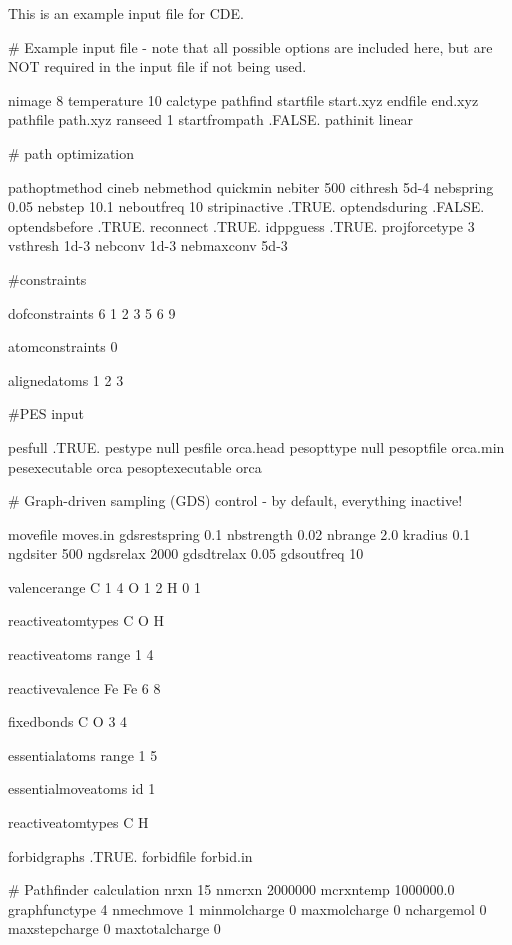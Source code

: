 This is an example input file for C\+DE.

\begin{DoxyVerb} # Example input file - note that all possible options are included here, but are NOT required in the input file if not being used.

 nimage 8
 temperature 10
 calctype pathfind 
 startfile start.xyz
 endfile end.xyz
 pathfile path.xyz
 ranseed  1
 startfrompath   .FALSE.
 pathinit  linear

 # path optimization

 pathoptmethod cineb
 nebmethod quickmin
 nebiter 500
 cithresh 5d-4
 nebspring 0.05
 nebstep  10.1
 neboutfreq 10
 stripinactive .TRUE.
 optendsduring .FALSE.
 optendsbefore .TRUE.
 reconnect .TRUE.
 idppguess .TRUE.
 projforcetype 3
 vsthresh 1d-3
 nebconv 1d-3
 nebmaxconv 5d-3

 #constraints

 dofconstraints 6
 1 2 3 5 6 9

 atomconstraints 0

 alignedatoms
 1 2 3

 #PES input

 pesfull .TRUE.
 pestype  null
 pesfile   orca.head
 pesopttype  null
 pesoptfile orca.min
 pesexecutable orca
 pesoptexecutable orca

 # Graph-driven sampling (GDS) control - by default, everything inactive!

 movefile moves.in
 gdsrestspring 0.1
 nbstrength 0.02
 nbrange 2.0
 kradius 0.1
 ngdsiter 500
 ngdsrelax 2000
 gdsdtrelax 0.05
 gdsoutfreq 10

 valencerange{
 C 1 4
 O 1 2
 H 0 1
 }

 reactiveatomtypes{
 C
 O
 H
 }

 reactiveatoms{
 range 1 4
 }

 reactivevalence{
 Fe Fe 6 8
 }

 fixedbonds{
 C O
 3 4
 }

 essentialatoms{
 range 1 5
 }

 essentialmoveatoms{
 id 1
 }

 reactiveatomtypes{
 C
 H
 }

 forbidgraphs .TRUE.
 forbidfile forbid.in

 # Pathfinder calculation
 nrxn 15
 nmcrxn 2000000
 mcrxntemp 1000000.0
 graphfunctype 4
 nmechmove 1
 minmolcharge 0
 maxmolcharge 0
 nchargemol 0
 maxstepcharge 0
 maxtotalcharge 0
\end{DoxyVerb}
 